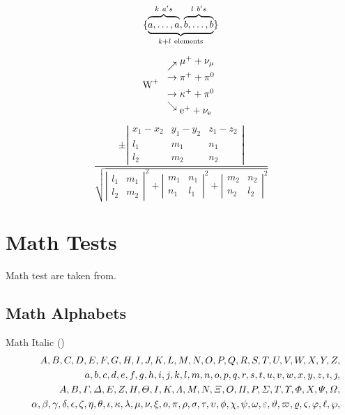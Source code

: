 \documentclass{article}
\def\test#1{#1}
\def\testnums{%
  \test 0 \test 1 \test 2 \test 3 \test 4 \test 5 \test 6 \test 7
  \test 8 \test 9 }
\def\testupperi{%
  \test A \test B \test C \test D \test E \test F \test G \test H
  \test I \test J \test K \test L \test M }
\def\testupperii{%
  \test N \test O \test P \test Q \test R \test S \test T \test U
  \test V \test W \test X \test Y \test Z }
\def\testupper{%
  \testupperi\testupperii}
\def\testloweri{%
  \test a \test b \test c \test d \test e \test f \test g \test h
  \test i \test j \test k \test l \test m }
\def\testlowerii{%
  \test n \test o \test p \test q \test r \test s \test t \test u
  \test v \test w \test x \test y \test z 
  \test\imath \test\jmath }
\def\testlower{%
  \testloweri\testlowerii}
\def\testupgreeki{%
  \test A \test B \test\Gamma \test\Delta \test E \test Z \test H
  \test\Theta \test I \test K \test\Lambda \test M }
\def\testupgreekii{%
  \test N \test\Xi \test O \test\Pi \test P \test\Sigma \test T
  \test\Upsilon \test\Phi \test X \test\Psi \test\Omega 
}
\def\testupgreek{%
  \testupgreeki\testupgreekii}
\def\testlowgreeki{%
  \test\alpha \test\beta \test\gamma \test\delta \test\epsilon
  \test\zeta \test\eta \test\theta \test\iota \test\kappa \test\lambda
  \test\mu }
\def\testlowgreekii{%
  \test\nu \test\xi \test o \test\pi \test\rho \test\sigma \test\tau
  \test\upsilon \test\phi \test\chi \test\psi \test\omega }
\def\testlowgreekiii{%
  \test\varepsilon \test\vartheta \test\varpi \test\varrho
  \test\varsigma \test\varphi \test\ell \test\wp}
\def\testlowgreek{%
  \testlowgreeki\testlowgreekii\testlowgreekiii}
\begin{document}
\begin{equation}
\{\underbrace{%
    \overbrace{\mathstrut a,\ldots,a}^{k\ a's},
    \overbrace{\mathstrut b,\ldots,b}^{l\ b's}}
  _{k+l\ \mathrm{elements}}                   \}
\end{equation}

\[
\mbox{W}^+\
\begin{array}{l}
\nearrow\raise5pt\hbox{$\mu^+ + \nu_{\mu}$}\\
\rightarrow         \pi^+ +\pi^0         \\[5pt]
\rightarrow \kappa^+ +\pi^0              \\
\searrow\lower5pt\hbox{$\mathrm{e}^+ 
          +\nu_{\scriptstyle\mathrm{e}}$}
\end{array}
\]

\[
\frac{\pm
\left|\begin{array}{ccc}
x_1-x_2  & y_1-y_2 & z_1-z_2 \\
l_1      & m_1     & n_1     \\
l_2      & m_2     & n_2
\end{array}\right|}{
\sqrt{\left|\begin{array}{cc}l_1&m_1\\
l_2&m_2\end{array}\right|^2
+     \left|\begin{array}{cc}m_1&n_1\\
n_1&l_1\end{array}\right|^2
+     \left|\begin{array}{cc}m_2&n_2\\
n_2&l_2\end{array}\right|^2}}
\]




\section{Math Tests}
\label{sec:mthtests}



Math test are taken from\cite{Schmidt04:PSNFSS9.2}.

\parindent 0pt


\subsection{Math Alphabets}

Math Italic (\texttt{\string\mathnormal})
\def\test#1{\mathnormal{#1},}
\begin{eqnarray*}
  && {\testupper}\\
  && {\testlower}\\ 
  && {\testupgreek}\\
  && {\testlowgreek}
\end{eqnarray*}%
\end{document}
